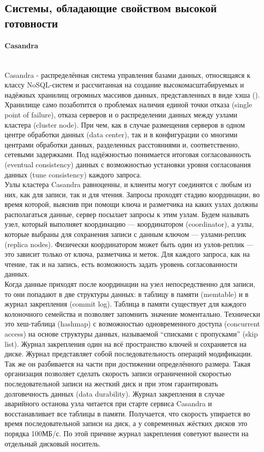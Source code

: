 \subsection{Системы, обладающие свойством высокой готовности}
\paragraph{Casandra}~\\
Casandra - распределённая система управления базами данных, относящаяся к классу NoSQL-систем и рассчитанная на создание высокомасштабируемых и надёжных хранилищ огромных массивов данных, представленных в виде хэша (\autocite{casandra}). \\
Хранилище само позаботится о проблемах наличия единой точки отказа (single point of failure), отказа серверов и о распределении данных между узлами кластера (cluster node). При чем, как в случае размещения серверов в одном центре обработки данных (data center), так и в конфигурации со многими центрами обработки данных, разделенных расстояниями и, соответственно, сетевыми задержками. Под надёжностью понимается итоговая согласованность (eventual consistency) данных с возможностью установки уровня согласования данных (tune consistency) каждого запроса. \\
Узлы кластера Casandra равноценны, и клиенты могут соединятся с любым из них, как для записи, так и для чтения. Запросы проходят стадию координации, во время которой, выяснив при помощи ключа и разметчика на каких узлах должны располагаться данные, сервер посылает запросы к этим узлам. Будем называть узел, который выполняет координацию — координатором (coordinator), а узлы, которые выбраны для сохранения записи с данным ключом — узлами-реплик (replica nodes). Физически координатором может быть один из узлов-реплик — это зависит только от ключа, разметчика и меток.
Для каждого запроса, как на чтение, так и на запись, есть возможность задать уровень согласованности данных. \\
Когда данные приходят после координации на узел непосредственно для записи, то они попадают в две структуры данных: в таблицу в памяти (memtable) и в журнал закрепления (commit log). Таблица в памяти существует для каждого колоночного семейства и позволяет запомнить значение моментально. Технически это хеш-таблица (hashmap) с возможностью одновременного доступа (concurrent access) на основе структуры данных, называемой “списками с пропусками” (skip list). Журнал закрепления один на всё пространство ключей и сохраняется на диске. Журнал представляет собой последовательность операций модификации. Так же он разбивается на части при достижении определённого размера.
Такая организация позволяет сделать скорость записи ограниченной скоростью последовательной записи на жесткий диск и при этом гарантировать долговечность данных (data durability). Журнал закрепления в случае аварийного останова узла читается при старте сервиса Casandra и восстанавливает все таблицы в памяти. Получается, что скорость упирается во время последовательной записи на диск, а у современных жёстких дисков это порядка 100МБ/с. По этой причине журнал закрепления советуют вынести на отдельный дисковый носитель.

